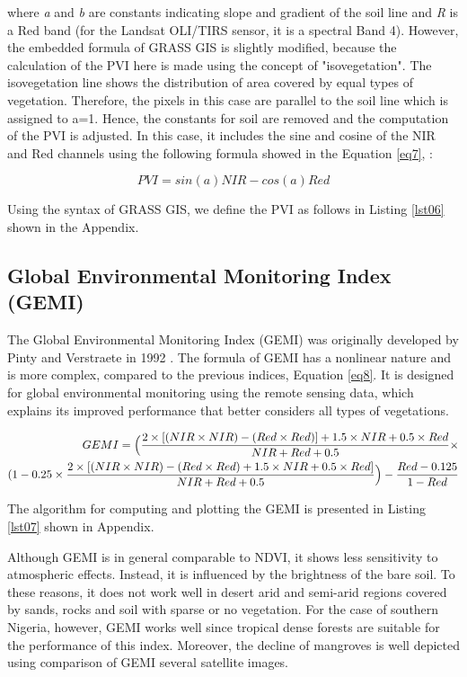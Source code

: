 \documentclass[jmse,article,submit,pdftex,moreauthors]{Definitions/mdpi}
\begin{document}
\noindent where \emph{a} and \emph{b} are constants indicating slope and gradient of the soil line and \emph{R} is a Red band (for the Landsat OLI/TIRS sensor, it is a spectral Band 4). However, the embedded formula of GRASS GIS is slightly modified, because the calculation of the PVI here is made using the concept of "isovegetation". The isovegetation line shows the distribution of area covered by equal types of vegetation. Therefore, the pixels in this case are parallel to the soil line which is assigned to a=1. Hence, the constants for soil are removed and the computation of the PVI is adjusted. In this case, it includes the sine and cosine of the NIR and Red channels using the following formula showed in the Equation \ref{eq7}, \cite{PERRY1984169}:

\begin{equation}\label{eq7}
	PVI = sin(a)NIR-cos(a)Red
\end{equation} 

Using the syntax of GRASS GIS, we define the PVI as follows in Listing \ref{lst06} shown in the Appendix.

\subsection{Global Environmental Monitoring Index (GEMI)}

The Global Environmental Monitoring Index (GEMI) was originally developed by Pinty and Verstraete in 1992 \cite{PintyVerstraete}. The formula of GEMI has a nonlinear nature and is more complex, compared to the previous indices, Equation \ref{eq8}. It is designed for global environmental monitoring using the remote sensing data, which explains its improved performance that better considers all types of vegetations. 

\begin{align}
GEMI = \Bigl( \frac{2\times[(NIR \times NIR)-(Red \times Red)] + 1.5\times NIR+0.5\times Red}{NIR + Red + 0.5} \times \nonumber\\
        (1 - 0.25 \times \frac{2 \times[(NIR \times NIR)-(Red \times Red) + 1.5 \times NIR+0.5 \times Red]}{NIR + Red + 0.5} \Bigr ) - \frac{Red - 0.125}{1 - Red} \label{eq8}
\end{align}

The algorithm for computing and plotting the GEMI is presented in Listing \ref{lst07} shown in Appendix.

Although GEMI is in general comparable to NDVI, it shows less sensitivity to atmospheric effects. Instead, it is influenced by the brightness of the bare soil. To these reasons, it does not work well in desert arid and semi-arid regions covered by sands, rocks and soil with sparse or no vegetation. For the case of southern Nigeria, however, GEMI works well since tropical dense forests are suitable for the performance of this index. Moreover, the decline of mangroves is well depicted using comparison of GEMI several satellite images.
\end{document}
